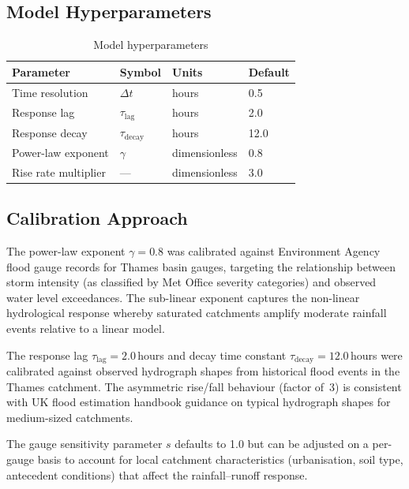 \documentclass[11pt,a4paper]{article}
\begin{document}
\subsection{Model Hyperparameters}

\begin{table}[H]
    \centering
    \caption{Model hyperparameters}
    \label{tab:model_params}
    \begin{tabular}{llll}
        \toprule
        \textbf{Parameter} & \textbf{Symbol} & \textbf{Units} & \textbf{Default} \\
        \midrule
        Time resolution & $\Delta t$ & hours & 0.5 \\
        Response lag & $\tau_{\text{lag}}$ & hours & 2.0 \\
        Response decay & $\tau_{\text{decay}}$ & hours & 12.0 \\
        Power-law exponent & $\gamma$ & dimensionless & 0.8 \\
        Rise rate multiplier & --- & dimensionless & 3.0 \\
        \bottomrule
    \end{tabular}
\end{table}

\subsection{Calibration Approach}

The power-law exponent $\gamma = 0.8$ was calibrated against Environment Agency
flood gauge records for Thames basin gauges, targeting the relationship between
storm intensity (as classified by Met Office severity categories) and observed
water level exceedances. The sub-linear exponent captures the non-linear
hydrological response whereby saturated catchments amplify moderate rainfall
events relative to a linear model.

The response lag $\tau_{\text{lag}} = 2.0$\,hours and decay time constant
$\tau_{\text{decay}} = 12.0$\,hours were calibrated against observed hydrograph
shapes from historical flood events in the Thames catchment. The asymmetric
rise/fall behaviour (factor of~3) is consistent with UK flood estimation
handbook guidance on typical hydrograph shapes for medium-sized catchments.

The gauge sensitivity parameter $s$ defaults to 1.0 but can be adjusted on a
per-gauge basis to account for local catchment characteristics (urbanisation,
soil type, antecedent conditions) that affect the rainfall--runoff response.
\end{document}
